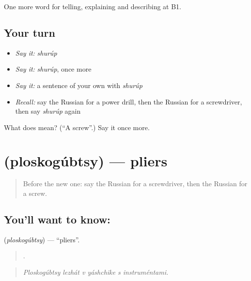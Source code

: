 \begin{grammarlens}[title={What you've built}]
One more word for telling, explaining and describing at B1.
\end{grammarlens}

\subsection*{Your turn}
\begin{itemize}
\raggedright
  \item \emph{Say it:} \emph{shurúp}
  \item \emph{Say it:} \emph{shurúp}, once more
  \item \emph{Say it:} a sentence of your own with \emph{shurúp}
  \item \emph{Recall:} say the Russian for a power drill, then the Russian for a screwdriver, then say \emph{shurúp} again
\end{itemize}

\begin{tcolorbox}[breakable,colback=teal!4,colframe=teal!35!black,title={Before you move on}]
What does  mean? (\textquotedblleft{}A screw\textquotedblright{}.) Say it once more.
\end{tcolorbox}
\section[\texorpdfstring{\ru{плоскогубцы} (ploskogúbtsy)}{плоскогубцы (ploskogúbtsy)}]{ (ploskogúbtsy) — pliers}

\label{lesson:RU-C533-ploskogubtsy}



\begin{quote}
Before the new one: say the Russian for a screwdriver, then the Russian for a screw.
\end{quote}

\subsection*{You'll want to know: }
\textbf{} (\emph{ploskogúbtsy}) — \textquotedblleft{}pliers\textquotedblright{}.

\begin{quote}
     .
\end{quote}

\begin{quote}
\emph{Ploskogúbtsy lezhát v yáshchike s instruméntami.}
\end{quote}


